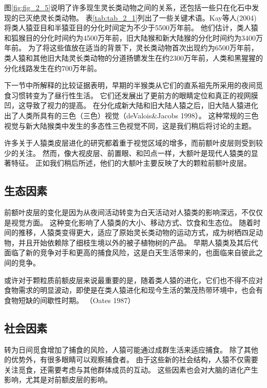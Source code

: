 图\ref{fig:fig_2_5}说明了许多现生灵长类动物之间的关系，还包括一些只在化石中发现的已灭绝灵长类动物。
表\ref{tab:tab_2_1}列出了一些关键术语。Kay等人(2004)将类人猿亚目和半猿亚目的分化时间定为不少于5500万年前。
他们估计，类人猿和狐猴目的分化时间约为4500万年前，旧大陆猴和新大陆猴的分化时间约为3400万年前。
为了将这些值放在适当的背景下，灵长类动物首次出现约为6500万年前，类人猿和其他旧大陆灵长类动物的分道扬镳发生在约2300万年前，人类和黑猩猩的分化线路发生在约700万年前。


下一节中所解释的比较证据表明，早期的半猴类从它们的直系祖先所采用的夜间觅食习惯转变为了昼行性生活。
它们还发展出了更前方的眼睛定位和真正的视网膜凹，这导致了视力的提高。
在分化成新大陆和旧大陆人猿之后，旧大陆人猿进化出了人类所具有的三色（三色）视觉\cite{williams2010new}（deValois\&Jacobs 1998）。
这种常规的三色视觉与新大陆猴类中发生的多态性三色视觉不同，这是我们稍后将讨论的主题。


许多关于人猿类皮层进化的研究都着重于视觉区域的增多\cite{kaas2020evolution}，而前额叶皮层则受到较少的关注。
然而，像大视皮层、前置眼、和凹点一样，大额叶是现代人猿类的显著特征。
正如我们稍后所述，他们的大额叶主要反映了大的颗粒前额叶皮层。



\subsection{生态因素}

前额叶皮层的变化是因为从夜间活动转变为白天活动对人猿类的影响深远，不仅仅是视觉方面。
这种变化影响了人猿类的大小、移动方式、饮食和生态位。
随着时间的推移，人猿类变得更大，适应了原始灵长类动物的运动方式，成为树栖四足动物，并且开始依赖除了细枝生境以外的被子植物树的产品。
早期人猿类及其后代面临了新的竞争对手和更高的捕食风险，这是白天生活带来的，也面临来自彼此之间的竞争。


或许对于颗粒质前额皮层来说最重要的是，随着类人猿的进化，它们也不得不应对食物需求的明显波动，即使是在类人猿进化和现今生活的繁茂热带环境中，也会有食物短缺的间歇性时期。 （Oates 1987）



\subsection{社会因素}

转为日间觅食增加了捕食的风险，人猿可能通过成群生活来适应捕食。
除了其他的优势外，有很多眼睛可以观察捕食者。
由于这些新的社会结构，人猿不仅需要关注觅食，还需要考虑与其他群体成员的互动。
这些因素也会对大脑的进化产生影响，尤其是对前额皮层的影响。


